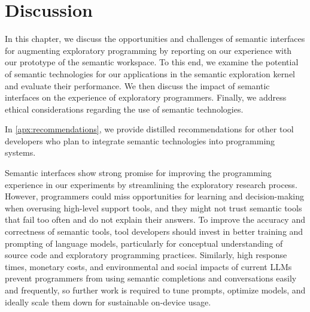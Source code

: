 
\chapter{Discussion}
\label{cha:discussion}

In this chapter, we discuss the opportunities and challenges of semantic interfaces for augmenting exploratory programming by reporting on our experience with our prototype of the semantic workspace.
To this end, we examine the potential of semantic technologies for our applications in the semantic exploration kernel and evaluate their performance.
We then discuss the impact of semantic interfaces on the experience of exploratory programmers.
Finally, we address ethical considerations regarding the use of semantic technologies.

In \cref{apx:recommendations}, we provide distilled recommendations for other tool developers who plan to integrate semantic technologies into programming systems.


\begin{summary}
	Semantic interfaces show strong promise for improving the programming experience in our experiments by streamlining the exploratory research process.
	However, programmers could miss opportunities for learning and decision-making when overusing high-level support tools, and they might not trust semantic tools that fail too often and do not explain their answers.
	To improve the accuracy and correctness of semantic tools, tool developers should invest in better training and prompting of language models, particularly for conceptual understanding of source code and exploratory programming practices.
	Similarly, high response times, monetary costs, and environmental and social impacts of current LLMs prevent programmers from using semantic completions and conversations easily and frequently, so further work is required to tune prompts, optimize models, and ideally scale them down for sustainable on-device usage.
\end{summary}

